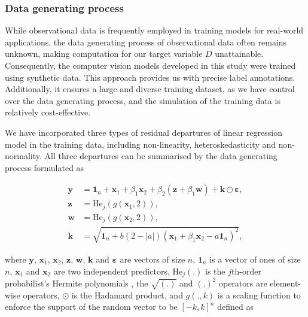\documentclass[]{interact}
\theoremstyle{plain}%
\theoremstyle{definition}
\theoremstyle{remark}
\begin{document}
\hypertarget{data-generating-process}{%
\subsubsection{Data generating process}\label{data-generating-process}}

While observational data is frequently employed in training models for
real-world applications, the data generating process of observational
data often remains unknown, making computation for our target variable
\(D\) unattainable. Consequently, the computer vision models developed
in this study were trained using synthetic data. This approach provides
us with precise label annotations. Additionally, it ensures a large and
diverse training dataset, as we have control over the data generating
process, and the simulation of the training data is relatively
cost-effective.

We have incorporated three types of residual departures of linear
regression model in the training data, including non-linearity,
heteroskedasticity and non-normality. All three departures can be
summarised by the data generating process formulated as

\begin{align}
\label{eq:data-sim}
\boldsymbol{y} &= \boldsymbol{1}_n + \boldsymbol{x}_1 + \beta_1\boldsymbol{x}_2 + \beta_2(\boldsymbol{z} + \beta_1\boldsymbol{w}) + \boldsymbol{k} \odot \boldsymbol{\varepsilon}, \\
\boldsymbol{z} &= \text{He}_j(g(\boldsymbol{x}_1, 2)), \\
\boldsymbol{w} &= \text{He}_j(g(\boldsymbol{x}_2, 2)), \\
\boldsymbol{k} &= \sqrt{\boldsymbol{1}_n + b(2 - |a|)(\boldsymbol{x}_1 + \beta_1\boldsymbol{x}_2 - a\boldsymbol{1}_n)^2},
\end{align}

\noindent where \(\boldsymbol{y}\), \(\boldsymbol{x}_1\),
\(\boldsymbol{x}_2\), \(\boldsymbol{z}\), \(\boldsymbol{w}\),
\(\boldsymbol{k}\) and \(\boldsymbol{\varepsilon}\) are vectors of size
\(n\), \(\boldsymbol{1}_n\) is a vector of ones of size \(n\),
\(\boldsymbol{x}_1\) and \(\boldsymbol{x}_2\) are two independent
predictors, \(\text{He}_j(.)\) is the \(j\)th-order probabilist's
Hermite polynomials \citep{hermite1864nouveau}, the \(\sqrt{(.)}\) and
\((.)^2\) operators are element-wise operators, \(\odot\) is the
Hadamard product, and \(g(., k)\) is a scaling function to enforce the
support of the random vector to be \([-k, k]^n\) defined as
\end{document}
